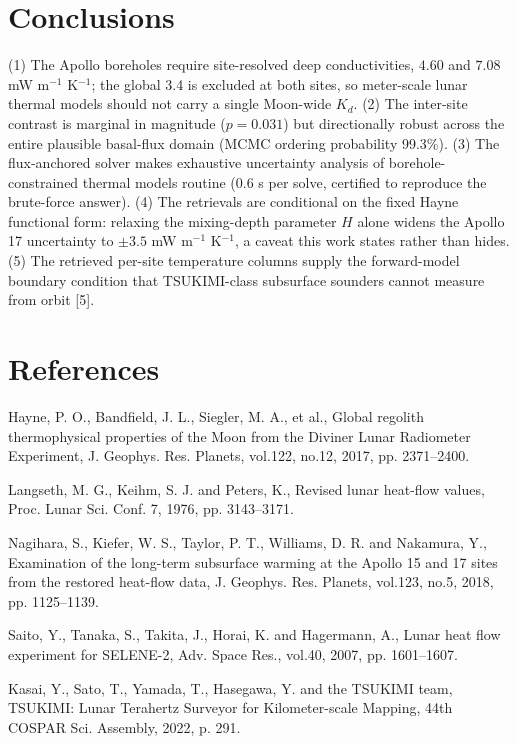 \documentclass[10pt,a4paper]{article}
\begin{document}
\section{Conclusions}
(1) The Apollo boreholes require site-resolved deep conductivities,
$4.60$ and $7.08$ mW m$^{-1}$ K$^{-1}$; the global 3.4 is excluded at
both sites, so meter-scale lunar thermal models should not carry a
single Moon-wide $K_d$. (2) The inter-site contrast is marginal in
magnitude ($p = 0.031$) but directionally robust across the entire
plausible basal-flux domain (MCMC ordering probability 99.3\%).
(3) The flux-anchored solver makes exhaustive uncertainty analysis of
borehole-constrained thermal models routine (0.6 s per solve, certified
to reproduce the brute-force answer). (4) The
retrievals are conditional on the fixed Hayne functional form: relaxing
the mixing-depth parameter $H$ alone widens the Apollo 17 uncertainty
to ${\pm}3.5$ mW m$^{-1}$ K$^{-1}$, a caveat this work states rather
than hides. (5) The retrieved per-site temperature columns supply the
forward-model boundary condition that TSUKIMI-class subsurface sounders
cannot measure from orbit [5].

\section*{References}
\begin{list}{}{\setlength{\leftmargin}{1.5em}\setlength{\itemindent}{-1.5em}
\setlength{\itemsep}{0pt}\setlength{\parsep}{0pt}}
\item[] [1] Hayne, P. O., Bandfield, J. L., Siegler, M. A., et al.,
Global regolith thermophysical properties of the Moon from the Diviner
Lunar Radiometer Experiment, J. Geophys. Res. Planets, vol.122, no.12,
2017, pp. 2371--2400.
\item[] [2] Langseth, M. G., Keihm, S. J. and Peters, K., Revised lunar
heat-flow values, Proc. Lunar Sci. Conf. 7, 1976, pp. 3143--3171.
\item[] [3] Nagihara, S., Kiefer, W. S., Taylor, P. T., Williams, D. R.
and Nakamura, Y., Examination of the long-term subsurface warming at the
Apollo 15 and 17 sites from the restored heat-flow data, J. Geophys.
Res. Planets, vol.123, no.5, 2018, pp. 1125--1139.
\item[] [4] Saito, Y., Tanaka, S., Takita, J., Horai, K. and
Hagermann, A., Lunar heat flow experiment for SELENE-2, Adv. Space Res.,
vol.40, 2007, pp. 1601--1607.
\item[] [5] Kasai, Y., Sato, T., Yamada, T., Hasegawa, Y. and the
TSUKIMI team, TSUKIMI: Lunar Terahertz Surveyor for Kilometer-scale
Mapping, 44th COSPAR Sci. Assembly, 2022, p. 291.
\end{list}
\end{document}
